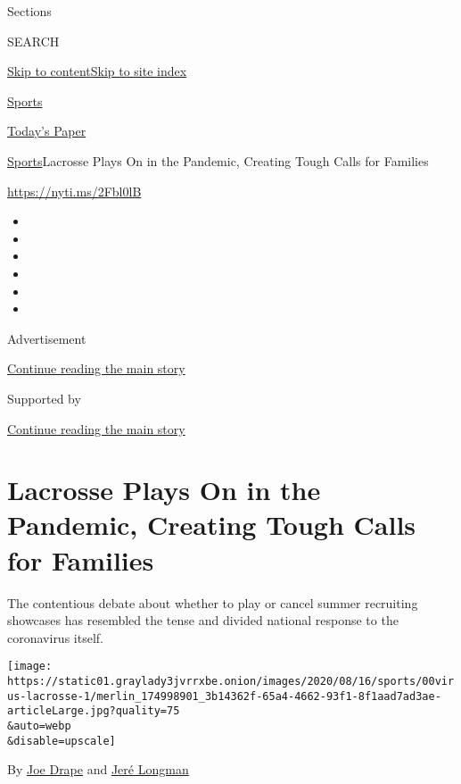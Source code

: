 Sections

SEARCH

\protect\hyperlink{site-content}{Skip to
content}\protect\hyperlink{site-index}{Skip to site index}

\href{https://www.nytimes3xbfgragh.onion/section/sports}{Sports}

\href{https://myaccount.nytimes3xbfgragh.onion/auth/login?response_type=cookie\&client_id=vi}{}

\href{https://www.nytimes3xbfgragh.onion/section/todayspaper}{Today's
Paper}

\href{/section/sports}{Sports}\textbar{}Lacrosse Plays On in the
Pandemic, Creating Tough Calls for Families

\url{https://nyti.ms/2Fbl0lB}

\begin{itemize}
\item
\item
\item
\item
\item
\item
\end{itemize}

Advertisement

\protect\hyperlink{after-top}{Continue reading the main story}

Supported by

\protect\hyperlink{after-sponsor}{Continue reading the main story}

\hypertarget{lacrosse-plays-on-in-the-pandemic-creating-tough-calls-for-families}{%
\section{Lacrosse Plays On in the Pandemic, Creating Tough Calls for
Families}\label{lacrosse-plays-on-in-the-pandemic-creating-tough-calls-for-families}}

The contentious debate about whether to play or cancel summer recruiting
showcases has resembled the tense and divided national response to the
coronavirus itself.

\texttt{[image: https://static01.graylady3jvrrxbe.onion/images/2020/08/16/sports/00virus-lacrosse-1/merlin\_174998901\_3b14362f-65a4-4662-93f1-8f1aad7ad3ae-articleLarge.jpg?quality=75\\\&auto=webp\\\&disable=upscale]}

By \href{https://www.nytimes3xbfgragh.onion/by/joe-drape}{Joe Drape} and
\href{https://www.nytimes3xbfgragh.onion/by/jere-longman}{Jeré Longman}


